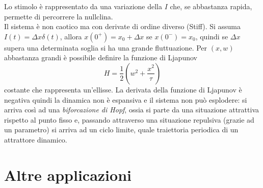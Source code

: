 \documentclass[12pt, a4paper]{book}
\theoremstyle{theorem}
\begin{document}
				Lo stimolo è rappresentato da una variazione della $I$ che, se abbastanza rapida, permette di percorrere la nullclina.\\
				Il sistema è non caotico ma con derivate di ordine diverso (Stiff).
				Si assuma $I(t)=\Delta x\delta(t)$, allora $x(0^+)=x_0+\Delta x$ se $x(0^-)=x_0$, quindi se $\Delta x$ supera una determinata soglia si ha una grande fluttuazione.
				Per $(x,w)$ abbastanza grandi è possibile definire la funzione di Ljapunov
				\begin{equation}
					H=\frac{1}{2}\left(w^2+\frac{x^2}{\tau}\right)
				\end{equation}
				costante che rappresenta un'ellisse.
				La derivata della funzione di Ljapunov è negativa quindi la dinamica non è espansiva e il sistema non può esplodere: si arriva così ad una \emph{biforcazione di Hopf}, ossia si parte da una situazione attrattiva rispetto al punto fisso e, passando attraverso una situazione repulsiva (grazie ad un parametro) si arriva ad un ciclo limite, quale traiettoria periodica di un attrattore dinamico.

	\chapter{Altre applicazioni} %
\end{document}
